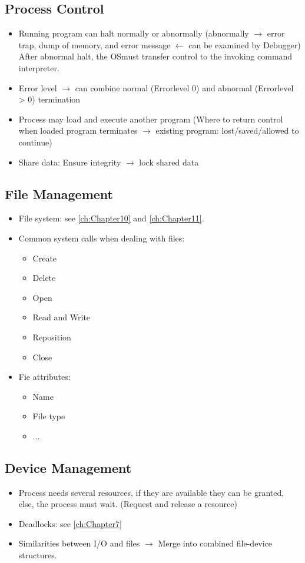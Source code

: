 \documentclass[10pt]{report}
\begin{document}
			\subsection{Process Control}
  			\begin{itemize}
  				\item Running program can halt normally or abnormally (abnormally $\rightarrow$ error trap, dump of memory, and error message $\leftarrow$ can be examined by Debugger) After abnormal halt, the OSmust transfer control to the invoking command interpreter.
  				\item Error level $\rightarrow$ can combine normal (Errorlevel 0) and abnormal (Errorlevel > 0) termination
  				\item Process may load and execute another program (Where to return control when loaded program terminates $\rightarrow$ existing program: lost/saved/allowed to continue)
  				\item Share data: Ensure integrity $\rightarrow$ lock shared data
  			\end{itemize}
			\subsection{File Management}
  			\begin{itemize}
  				\item 	File system: see \autoref{ch:Chapter10} and \autoref{ch:Chapter11}.
  				\item Common system calls when dealing with files:
  				\begin{itemize}
  					\item Create
  					\item Delete
  					\item Open
  					\item Read and Write
  					\item Reposition
  					\item Close
  				\end{itemize}
  				\item Fie attributes:
  				\begin{itemize}
  					\item Name
  					\item File type
  					\item ...
  				\end{itemize}
  			\end{itemize}
			\subsection{Device Management}
  			\begin{itemize}
  				\item Process needs several resources, if they are available they can be granted, else, the process must wait. (Request and release a resource)
  				\item Deadlocks: see \autoref{ch:Chapter7}
  				\item Similarities between I/O and files $\rightarrow$ Merge into combined file-device structures.
  			\end{itemize}
\end{document}
